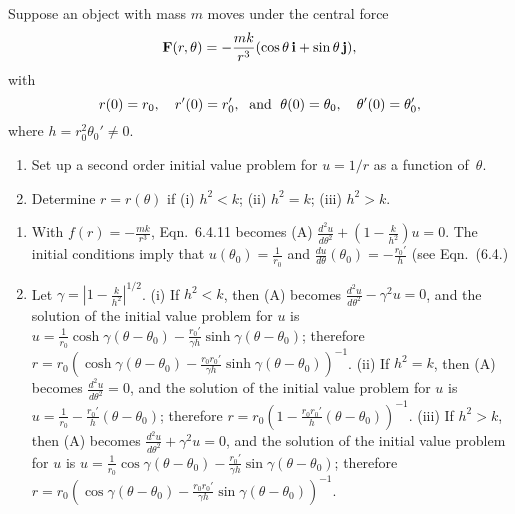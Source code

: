 \documentclass{ximera}
\begin{document}
\begin{problem}\label{exer:6.4.6}
Suppose an object with mass $m$ moves under the central force
$$
{\bf F}(r,\theta)=-\frac{mk}{r^3}(\cos\theta\,{\bf i}+\sin\theta\,{\bf
j}),
$$
with
$$
r(0)=r_0,\quad  r'(0)=r_0', \text{\; and \;} \theta(0)=\theta_0,\quad
\theta'(0)=\theta_0',
$$
 where $h=r_0^2\theta_0'\ne0$.
\begin{enumerate}
\item %
 Set up a second order initial
value problem for $u=1/r$ as a function of~$\theta$.
\item %
Determine $r=r(\theta)$ if (i) $h^2<k$;\;   (ii) $h^2=k$;\;   (iii)
$h^2>k$.
\end{enumerate}

\begin{solution}
\begin{enumerate}
    \item With $f(r)=-\frac{mk}{ r^3}$, Eqn.~6.4.11 becomes
(A) $\frac{d^2u}{ d\theta^2}+\left(1-\frac{k}{ h^2}\right)u=0$. The
initial conditions imply that $u(\theta_0)=\frac{1}{ r_0}$ and
$\frac{du}{ d\theta}(\theta_0)=-\frac{r_0'}{ h}$ (see
Eqn.~(6.4.)

\item Let $\gamma=\left|1-\frac{k}{ h^2}\right|^{1/2}$. (i) If
$h^2<k$, then (A) becomes $\frac{d^2u}{ d\theta^2}-\gamma^2u=0$, and
the solution of the initial value problem for $u$ is $u=\frac{1}{
r_0}\cosh\gamma(\theta-\theta_0)-\frac{r_0'}{\gamma
h}\sinh\gamma(\theta-\theta_0)$; therefore $r=r_0\left(
\cosh\gamma(\theta-\theta_0)-\frac{r_0r_0'}{\gamma
h}\sinh\gamma(\theta-\theta_0)\right)^{-1}$. (ii) If $h^2=k$, then (A)
becomes $\frac{d^2u}{ d\theta^2}=0$, and the solution of the initial
value problem for $u$ is $u=\frac{1}{ r_0}-\frac{r_0'}{
h}(\theta-\theta_0)$; therefore $r=r_0\left(1 -\frac{r_0r_0'}{
h}(\theta-\theta_0)\right)^{-1}$. (iii) If $h^2>k$, then (A) becomes
$\frac{d^2u}{ d\theta^2}+\gamma^2u=0$, and the solution of the
initial value problem for $u$ is $u=\frac{1}{
r_0}\cos\gamma(\theta-\theta_0)-\frac{r_0'}{\gamma
h}\sin\gamma(\theta-\theta_0)$; therefore $r=r_0\left(
\cos\gamma(\theta-\theta_0)-\frac{r_0r_0'}{\gamma
h}\sin\gamma(\theta-\theta_0)\right)^{-1}$.
\end{enumerate}
\end{solution}
\end{problem}
\end{document}

